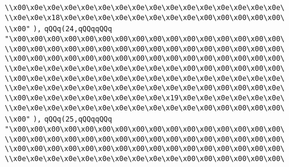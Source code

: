 \verb|\\x00\x0e\x0e\x0e\x0e\x0e\x0e\x0e\x0e\x0e\x0e\x0e\x0e\x0e\x0e\x0e\|\newline
\verb|\\x0e\x0e\x18\x0e\x0e\x0e\x0e\x0e\x0e\x0e\x0e\x00\x00\x00\x00\x00\|\newline
\verb|\\x00"|\newline
\verb|),|\newline
\verb|qQQq(24,qQQqqQQq|\newline
\verb|"\x00\x00\x00\x00\x00\x00\x00\x00\x00\x00\x00\x00\x00\x00\x00\x00\|\newline
\verb|\\x00\x00\x00\x00\x00\x00\x00\x00\x00\x00\x00\x00\x00\x00\x00\x00\|\newline
\verb|\\x00\x00\x00\x00\x00\x00\x00\x00\x00\x00\x00\x00\x00\x00\x00\x00\|\newline
\verb|\\x0e\x0e\x0e\x0e\x0e\x0e\x0e\x0e\x0e\x0e\x00\x00\x00\x00\x00\x00\|\newline
\verb|\\x00\x0e\x0e\x0e\x0e\x0e\x0e\x0e\x0e\x0e\x0e\x0e\x0e\x0e\x0e\x0e\|\newline
\verb|\\x0e\x0e\x0e\x0e\x0e\x0e\x0e\x0e\x0e\x0e\x0e\x00\x00\x00\x00\x0e\|\newline
\verb|\\x00\x0e\x0e\x0e\x0e\x0e\x0e\x0e\x0e\x19\x0e\x0e\x0e\x0e\x0e\x0e\|\newline
\verb|\\x0e\x0e\x0e\x0e\x0e\x0e\x0e\x0e\x0e\x0e\x0e\x00\x00\x00\x00\x00\|\newline
\verb|\\x00"|\newline
\verb|),|\newline
\verb|qQQq(25,qQQqqQQq|\newline
\verb|"\x00\x00\x00\x00\x00\x00\x00\x00\x00\x00\x00\x00\x00\x00\x00\x00\|\newline
\verb|\\x00\x00\x00\x00\x00\x00\x00\x00\x00\x00\x00\x00\x00\x00\x00\x00\|\newline
\verb|\\x00\x00\x00\x00\x00\x00\x00\x00\x00\x00\x00\x00\x00\x00\x00\x00\|\newline
\verb|\\x0e\x0e\x0e\x0e\x0e\x0e\x0e\x0e\x0e\x0e\x00\x00\x00\x00\x00\x00\|\newline
